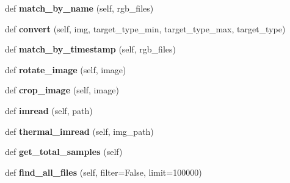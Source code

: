 \begin{DoxyCompactItemize}
\item 
\mbox{\label{classmodels_1_1data__loader2_1_1DataLoader2_a83ae26ab8bba8b6999978bac07b92261}} 
def {\bfseries match\+\_\+by\+\_\+name} (self, rgb\+\_\+files)
\item 
\mbox{\label{classmodels_1_1data__loader2_1_1DataLoader2_a2ba7c0e3e100bed2d814ecbb0fd0080d}} 
def {\bfseries convert} (self, img, target\+\_\+type\+\_\+min, target\+\_\+type\+\_\+max, target\+\_\+type)
\item 
\mbox{\label{classmodels_1_1data__loader2_1_1DataLoader2_ab183f7945b33ed9304970752275e33fe}} 
def {\bfseries match\+\_\+by\+\_\+timestamp} (self, rgb\+\_\+files)
\item 
\mbox{\label{classmodels_1_1data__loader2_1_1DataLoader2_ab51678879aaf569b133b0b46dc9e692f}} 
def {\bfseries rotate\+\_\+image} (self, image)
\item 
\mbox{\label{classmodels_1_1data__loader2_1_1DataLoader2_a6762cd7743293502d05fed6f95a96b17}} 
def {\bfseries crop\+\_\+image} (self, image)
\item 
\mbox{\label{classmodels_1_1data__loader2_1_1DataLoader2_a48636a2058f3b7cc5c1c54d5242d7442}} 
def {\bfseries imread} (self, path)
\item 
\mbox{\label{classmodels_1_1data__loader2_1_1DataLoader2_a9e11232abbd62883706947d4e704a5df}} 
def {\bfseries thermal\+\_\+imread} (self, img\+\_\+path)
\item 
\mbox{\label{classmodels_1_1data__loader2_1_1DataLoader2_a77ff1c927d52c527d53d887b78d2a70b}} 
def {\bfseries get\+\_\+total\+\_\+samples} (self)
\item 
\mbox{\label{classmodels_1_1data__loader2_1_1DataLoader2_a3c691a684ad27a909be42382cbe90698}} 
def {\bfseries find\+\_\+all\+\_\+files} (self, filter=False, limit=100000)
\end{DoxyCompactItemize}
